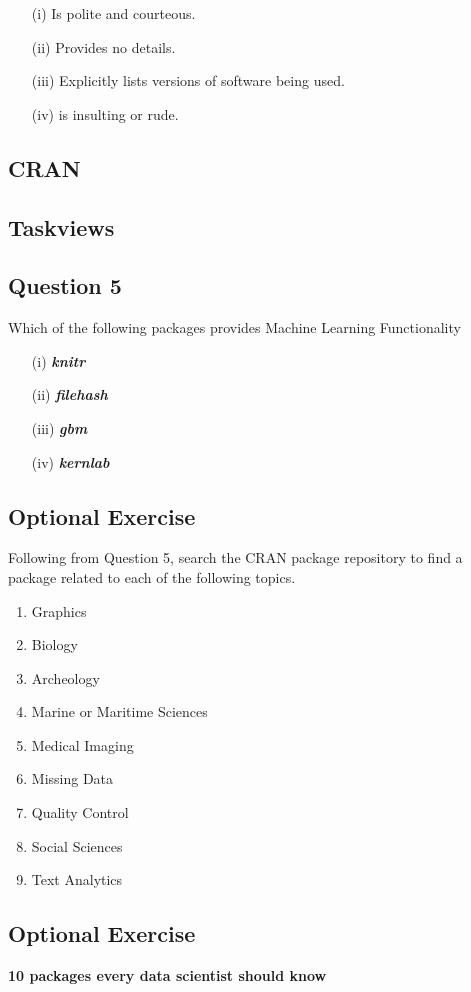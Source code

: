 \documentclass[12pt]{article}
\begin{document}
\begin{itemize}

\item[(i)] Is polite and courteous. 

\item[(ii)] Provides no details. 

\item[(iii)] Explicitly lists versions of software being used. 

\item[(iv)] is insulting or rude. 
\end{itemize}


\newpage
\subsection*{CRAN}

\subsection*{Taskviews}


\newpage
\subsection*{Question 5}

Which of the following packages provides Machine Learning Functionality
\begin{itemize}
\item[(i)] \textbf{\textit{knitr}}
\item[(ii)] \textbf{\textit{filehash}}
\item[(iii)] \textbf{\textit{gbm}}
\item[(iv)] \textbf{\textit{kernlab}}
\end{itemize}

\newpage
\subsection*{Optional Exercise}
Following from Question 5, search the CRAN package repository to find a package 
related to each of the following topics.
\begin{enumerate}
\item Graphics
\item Biology
\item Archeology
\item Marine or Maritime Sciences
\item Medical Imaging
\item Missing Data
\item Quality Control
\item Social Sciences
\item Text Analytics
\end{enumerate}

\newpage
\subsection*{Optional Exercise}

\textbf{10 packages every data scientist should know}
\end{document}
